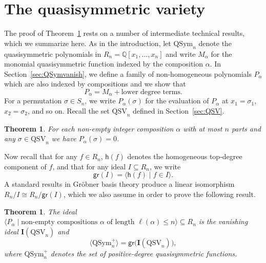\documentclass[submission]{FPSAC2024}
\newtheorem{thm}[equation]{Theorem}
\theoremstyle{definition}
\theoremstyle{remark}
\numberwithin{equation}{section}
\newcommand{\QQ}{\mathbb{Q}}
\newcommand{\QSym}{\mathrm{QSym}}
\newcommand{\QSV}{\mathrm{QSV}}
\begin{document}
\section{The quasisymmetric variety}
\label{sec:vanishingtheorems}

The proof of Theorem~\ref{thm:vanishingQSV} rests on a number of intermediate technical results, which we summarize here.
As in the introduction, let $\QSym_{n}$ denote the quasisymmetric polynomials in $R_{n} = \QQ[x_{1}, \ldots, x_{n}]$ and write $M_{\alpha}$ for the monomial quasisymmetric function indexed by the composition $\alpha$.  In Section~\ref{sec:QSymvanish}, we define a family of non-homogeneous polynomials $P_{\alpha}$ which are also indexed by compositions and we show that
\begin{equation}
\label{eq:Palphahomogeneous}
P_{\alpha} = M_{\alpha} + \text{lower degree terms}.
\end{equation}
For a permutation $\sigma \in S_{n}$, we write $P_{\alpha}(\sigma)$ for the evaluation of $P_{\alpha}$ at $x_{1} = \sigma_{1}$, $x_{2} = \sigma_{2}$, and so on.  Recall the set $\QSV_{n}$ defined in Section~\ref{sec:QSV}.

\begin{thm}
\label{thm:vanishing}
For each non-empty integer composition $\alpha$ with at most $n$ parts and any $\sigma\in \QSV_n$ we have $P_{\alpha} (\sigma)=0$.
\end{thm}


Now recall that for any $f \in R_{n}$, $\mathsf{h}(f)$ denotes the homogeneous top-degree component of $f$, and that for any ideal $I \subseteq R_{n}$, we write
\[
\mathsf{gr}(I) = \langle \mathsf{h}(f) \;|\; f \in I \rangle.
\]
A standard results in Gr\"{o}bner basis theory produce a linear isomorphism $R_{n}\big/I \cong R_{n} \big/ \mathsf{gr}(I)$, which we also assume in order to prove the following result.

\begin{thm}\label{thm:vanishingQSV} 
The ideal $\langle P_{\alpha} \;|\; \text{non-empty compositions $\alpha$ of length $\ell(\alpha) \le n$} \rangle \subseteq R_n$ is the vanishing ideal $\mathbf{I}(\QSV_n)$ and 
\[
\langle \QSym_{n}^{+} \rangle = \mathsf{gr}\big(\mathbf{I}(\QSV_{n})\big),
\]
where  $\QSym_{n}^{+}$ denotes the set of positive-degree quasisymmetric functions.
 \end{thm}
 
\end{document}
